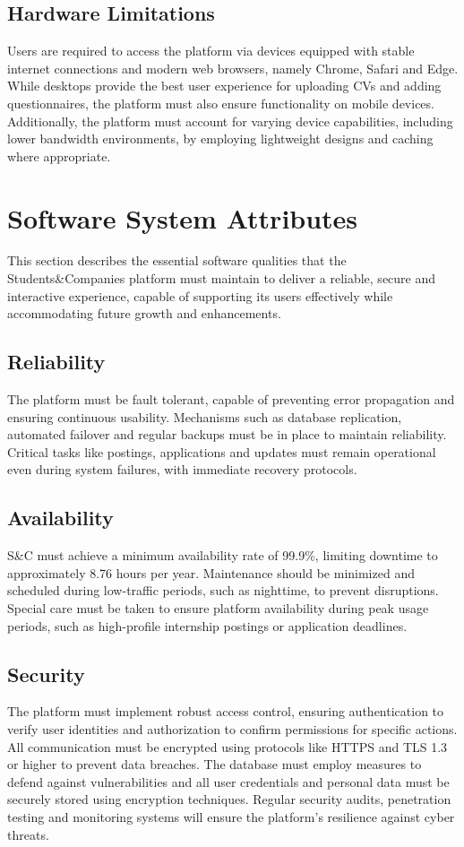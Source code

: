 \subsection{Hardware Limitations}
Users are required to access the platform via devices equipped with stable internet connections and modern web browsers, namely Chrome, Safari and Edge.
While desktops provide the best user experience for uploading CVs and adding questionnaires, the platform must also ensure functionality on mobile devices.
Additionally, the platform must account for varying device capabilities, including lower bandwidth environments, by employing lightweight designs and caching where appropriate.

\section{Software System Attributes}
This section describes the essential software qualities that the Students\&Companies platform must maintain to deliver a reliable, secure and interactive experience, capable of supporting its users effectively while accommodating future growth and enhancements.

\subsection{Reliability}
The platform must be fault tolerant, capable of preventing error propagation and ensuring continuous usability.
Mechanisms such as database replication, automated failover and regular backups must be in place to maintain reliability.
Critical tasks like postings, applications and updates must remain operational even during system failures, with immediate recovery protocols.

\subsection{Availability}
S\&C must achieve a minimum availability rate of 99.9\%, limiting downtime to approximately 8.76 hours per year.
Maintenance should be minimized and scheduled during low-traffic periods, such as nighttime, to prevent disruptions.
Special care must be taken to ensure platform availability during peak usage periods, such as high-profile internship postings or application deadlines.

\subsection{Security}
The platform must implement robust access control, ensuring authentication to verify user identities and authorization to confirm permissions for specific actions.
All communication must be encrypted using protocols like HTTPS and TLS 1.3 or higher to prevent data breaches.
The database must employ measures to defend against vulnerabilities and all user credentials and personal data must be securely stored using encryption techniques.
Regular security audits, penetration testing and monitoring systems will ensure the platform's resilience against cyber threats.

